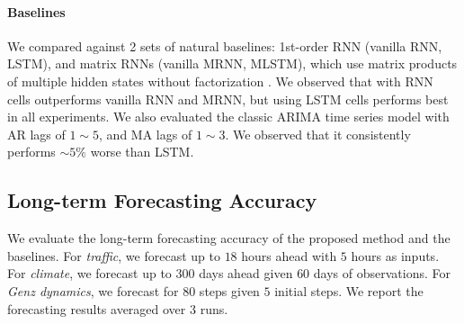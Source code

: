 \paragraph{Baselines}
We compared \trnn{} against 2 sets of natural baselines: 1st-order RNN (vanilla RNN, LSTM), and matrix RNNs (vanilla MRNN, MLSTM), which use matrix products of multiple hidden states without factorization \citep{soltani2016higher}.
%
We observed that \trnn{} with RNN cells outperforms vanilla RNN and MRNN, but using LSTM cells performs best in all experiments. We also evaluated the classic ARIMA time series model  with AR lags of $1 \sim 5$, and MA lags of $1 \sim 3$.   We  observed that it consistently performs $\sim 5\%$ worse than LSTM.
% 
\subsection{Long-term Forecasting Accuracy}
We evaluate the long-term forecasting accuracy of the proposed method and the baselines. 
For \textsl{traffic}, we forecast up to $18$ hours ahead with $5$ hours as  inputs.
%
For \textsl{climate}, we forecast up to $300$ days ahead given $60$ days of  observations.
%
For \textsl{Genz dynamics}, we forecast for $80$ steps given $5$ initial steps.
%
We report the forecasting results  averaged over $3$ runs.

